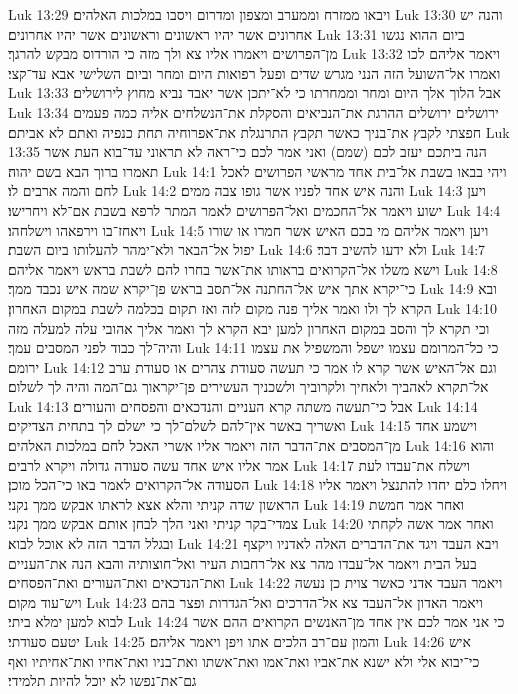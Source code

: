 Luk 13:29  ויבאו ממזרח וממערב ומצפון ומדרום ויסבו במלכות האלהים׃
Luk 13:30  והנה יש אחרונים אשר יהיו ראשונים וראשונים אשר יהיו אחרונים׃
Luk 13:31  ביום ההוא נגשו מן־הפרושים ויאמרו אליו צא ולך מזה כי הורדוס מבקש להרגך׃
Luk 13:32  ויאמר אליהם לכו ואמרו אל־השועל הזה הנני מגרש שדים ופעל רפואות היום ומחר וביום השלישי אבא עד־קצי׃
Luk 13:33  אבל הלוך אלך היום ומחר וממחרתו כי לא־יתכן אשר יאבד נביא מחוץ לירושלים׃
Luk 13:34  ירושלים ירושלים ההרגת את־הנביאים והסקלת את־הנשלחים אליה כמה פעמים חפצתי לקבץ את־בניך כאשר תקבץ התרנגלת את־אפרוחיה תחת כנפיה ואתם לא אביתם׃
Luk 13:35  הנה ביתכם יעזב לכם (שמם) ואני אמר לכם כי־ראה לא תראוני עד־בוא העת אשר תאמרו ברוך הבא בשם יהוה׃
Luk 14:1  ויהי בבאו בשבת אל־בית אחד מראשי הפרושים לאכל לחם והמה ארבים לו׃
Luk 14:2  והנה איש אחד לפניו אשר גופו צבה ממים׃
Luk 14:3  ויען ישוע ויאמר אל־החכמים ואל־הפרושים לאמר המתר לרפא בשבת אם־לא ויחרישו׃
Luk 14:4  ויאחז־בו וירפאהו וישלחהו׃
Luk 14:5  ויען ויאמר אליהם מי בכם האיש אשר חמרו או שורו יפול אל־הבאר ולא־ימהר להעלותו ביום השבת׃
Luk 14:6  ולא ידעו להשיב דבר׃
Luk 14:7  וישא משלו אל־הקרואים בראותו את־אשר בחרו להם לשבת בראש ויאמר אליהם׃
Luk 14:8  כי־יקרא אתך איש אל־החתנה אל־תסב בראש פן־יקרא שמה איש נכבד ממך׃
Luk 14:9  ובא הקרא לך ולו ואמר אליך פנה מקום לזה ואז תקום בכלמה לשבת במקום האחרון׃
Luk 14:10  וכי תקרא לך והסב במקום האחרון למען יבא הקרא לך ואמר אליך אהובי עלה למעלה מזה והיה־לך כבוד לפני המסבים עמך׃
Luk 14:11  כי כל־המרומם עצמו ישפל והמשפיל את עצמו ירומם׃
Luk 14:12  וגם אל־האיש אשר קרא לו אמר כי תעשה סעודת צהרים או סעודת ערב אל־תקרא לאהביך ולאחיך ולקרוביך ולשכניך העשירים פן־יקראוך גם־המה והיה לך לשלום׃
Luk 14:13  אבל כי־תעשה משתה קרא העניים והנדכאים והפסחים והעורים׃
Luk 14:14  ואשריך באשר אין־להם לשלם־לך כי ישלם לך בתחית הצדיקים׃
Luk 14:15  וישמע אחד מן־המסבים את־הדבר הזה ויאמר אליו אשרי האכל לחם במלכות האלהים׃
Luk 14:16  והוא אמר אליו איש אחד עשה סעודה גדולה ויקרא לרבים׃
Luk 14:17  וישלח את־עבדו לעת הסעודה אל־הקרואים לאמר באו כי־הכל מוכן׃
Luk 14:18  ויחלו כלם יחדו להתנצל ויאמר אליו הראשון שדה קניתי והלא אצא לראתו אבקש ממך נקני׃
Luk 14:19  ואחר אמר חמשת צמדי־בקר קניתי ואני הלך לבחן אותם אבקש ממך נקני׃
Luk 14:20  ואחר אמר אשה לקחתי ובגלל הדבר הזה לא אוכל לבוא׃
Luk 14:21  ויבא העבד ויגד את־הדברים האלה לאדניו ויקצף בעל הבית ויאמר אל־עבדו מהר צא אל־רחבות העיר ואל־חוצותיה והבא הנה את־העניים ואת־הנדכאים ואת־העורים ואת־הפסחים׃
Luk 14:22  ויאמר העבד אדני כאשר צוית כן נעשה ויש־עוד מקום׃
Luk 14:23  ויאמר האדון אל־העבד צא אל־הדרכים ואל־הגדרות ופצר בהם לבוא למען ימלא ביתי׃
Luk 14:24  כי אני אמר לכם אין אחד מן־האנשים הקרואים ההם אשר יטעם סעודתי׃
Luk 14:25  והמון עם־רב הלכים אתו ויפן ויאמר אליהם׃
Luk 14:26  איש כי־יבוא אלי ולא ישנא את־אביו ואת־אמו ואת־אשתו ואת־בניו ואת־אחיו ואת־אחיתיו ואף גם־את־נפשו לא יוכל להיות תלמידי׃
